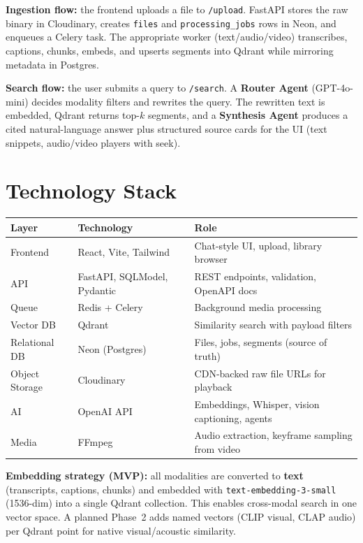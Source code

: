 \documentclass[10pt,a4paper]{article}
\begin{document}
\textbf{Ingestion flow:} the frontend uploads a file to \texttt{/upload}. FastAPI stores the raw binary in Cloudinary, creates \texttt{files} and \texttt{processing\_jobs} rows in Neon, and enqueues a Celery task. The appropriate worker (text/audio/video) transcribes, captions, chunks, embeds, and upserts segments into Qdrant while mirroring metadata in Postgres.

\textbf{Search flow:} the user submits a query to \texttt{/search}. A \textbf{Router Agent} (GPT-4o-mini) decides modality filters and rewrites the query. The rewritten text is embedded, Qdrant returns top-$k$ segments, and a \textbf{Synthesis Agent} produces a cited natural-language answer plus structured source cards for the UI (text snippets, audio/video players with seek).

\section{Technology Stack}

\begin{table}[h]
\centering\small
\begin{tabular}{@{}lll@{}}
\toprule
\textbf{Layer} & \textbf{Technology} & \textbf{Role} \\
\midrule
Frontend & React, Vite, Tailwind & Chat-style UI, upload, library browser \\
API & FastAPI, SQLModel, Pydantic & REST endpoints, validation, OpenAPI docs \\
Queue & Redis + Celery & Background media processing \\
Vector DB & Qdrant & Similarity search with payload filters \\
Relational DB & Neon (Postgres) & Files, jobs, segments (source of truth) \\
Object Storage & Cloudinary & CDN-backed raw file URLs for playback \\
AI & OpenAI API & Embeddings, Whisper, vision captioning, agents \\
Media & FFmpeg & Audio extraction, keyframe sampling from video \\
\bottomrule
\end{tabular}
\end{table}

\textbf{Embedding strategy (MVP):} all modalities are converted to \textbf{text} (transcripts, captions, chunks) and embedded with \texttt{text-embedding-3-small} (1536-dim) into a single Qdrant collection. This enables cross-modal search in one vector space. A planned Phase~2 adds named vectors (CLIP visual, CLAP audio) per Qdrant point for native visual/acoustic similarity.
\end{document}
